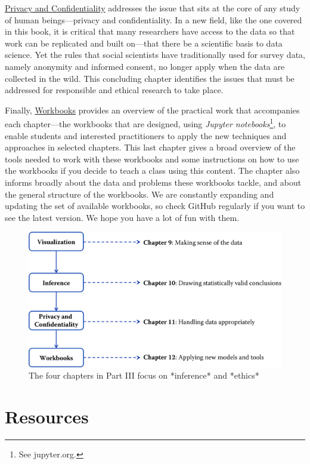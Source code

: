 \documentclass[]{krantz}
\begin{document}
\protect\hyperlink{chap:privacy}{Privacy and Confidentiality} addresses
the issue that sits at the core of any study of human beings---privacy
and confidentiality. In a new field, like the one covered in this book,
it is critical that many researchers have access to the data so that
work can be replicated and built on---that there be a scientific basis
to data science. Yet the rules that social scientists have traditionally
used for survey data, namely anonymity and informed consent, no longer
apply when the data are collected in the wild. This concluding chapter
identifies the issues that must be addressed for responsible and ethical
research to take place.

Finally, \protect\hyperlink{chap:workbooks}{Workbooks} provides an
overview of the practical work that accompanies each chapter---the
workbooks that are designed, using \emph{Jupyter notebooks}\footnote{See
  jupyter.org.}, to enable students and interested practitioners to
apply the new techniques and approaches in selected chapters. This last
chapter gives a broad overview of the tools needed to work with these
workbooks and some instructions on how to use the workbooks if you
decide to teach a class using this content. The chapter also informs
broadly about the data and problems these workbooks tackle, and about
the general structure of the workbooks. We are constantly expanding and
updating the set of available workbooks, so check GitHub regularly if
you want to see the latest version. We hope you have a lot of fun with
them.

\begin{figure}

{\centering \includegraphics[width=0.7\linewidth]{ChapterIntro/figures/Figure4} 

}

\caption{The four chapters in Part III focus on *inference* and *ethics*}\label{fig:fig5}
\end{figure}

\section{Resources}\label{sec:intro:resources}
\end{document}
